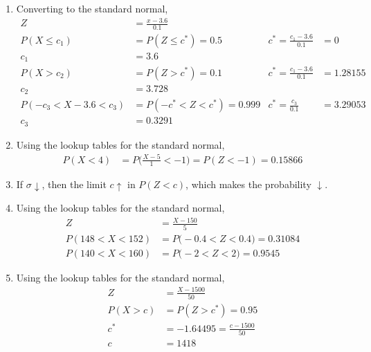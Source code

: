 \begin{enumerate}
    \item Converting to the standard normal,
          \begin{align}
              Z                         & = \frac{x-3.6}{0.1}           \\
              P(X \leq c_1)             & = P(Z \leq c^*) = 0.5       &
              c^* = \frac{c_1-3.6}{0.1} & = 0                           \\
              c_1                       & = 3.6                         \\
              P(X > c_2)                & = P(Z > c^*) = 0.1          &
              c^* = \frac{c_1-3.6}{0.1} & = 1.28155                     \\
              c_2                       & = 3.728                       \\
              P(-c_3 < X-3.6 < c_3)     & = P(-c^* < Z < c^*) = 0.999 &
              c^* = \frac{c_3}{0.1}     & = 3.29053                     \\
              c_3                       & = 0.3291
          \end{align}

    \item Using the lookup tables for the standard normal,
          \begin{align}
              P(X < 4) & = P\Bigg( \frac{X-5}{1} < -1 \Bigg) = P(Z < -1) = 0.15866
          \end{align}

    \item If $ \sigma \downarrow $, then the limit $ c \uparrow$ in $ P(Z < c) $, which
          makes the probability $ \downarrow $.

    \item Using the lookup tables for the standard normal,
          \begin{align}
              Z                & = \frac{X - 150}{5}                      \\
              P(148 < X < 152) & = P\Bigg(-0.4 < Z < 0.4 \Bigg) = 0.31084 \\
              P(140 < X < 160) & = P\Bigg(-2 < Z < 2 \Bigg) = 0.9545
          \end{align}

    \item Using the lookup tables for the standard normal,
          \begin{align}
              Z        & = \frac{X - 1500}{50}            \\
              P(X > c) & = P(Z > c^* ) = 0.95             \\
              c^*      & = -1.64495 = \frac{c - 1500}{50} \\
              c        & = 1418
          \end{align}


\end{enumerate}
